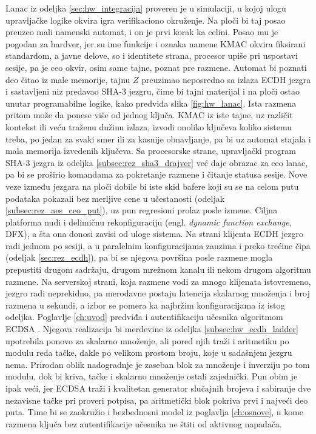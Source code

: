 Lanac iz odeljka \ref{sec:hw_integracija} proveren je u simulaciji, u kojoj ulogu upravljačke logike okvira igra verifikaciono okruženje. Na ploči bi taj posao preuzeo mali namenski automat, i on je prvi korak ka celini. Posao mu je pogodan za hardver, jer su ime funkcije i oznaka namene KMAC okvira fiksirani standardom, a javne delove, so i identitete strana, procesor upiše pri uspostavi sesije, pa je ceo okvir, osim same tajne, poznat pre razmene. Automat bi poznati deo čitao iz male memorije, tajnu $Z$ preuzimao neposredno sa izlaza ECDH jezgra i sastavljeni niz predavao SHA-3 jezgru, čime bi tajni materijal i na ploči ostao unutar programabilne logike, kako predviđa slika \ref{fig:hw_lanac}. Ista razmena pritom može da ponese više od jednog ključa. KMAC iz iste tajne, uz različit kontekst ili veću traženu dužinu izlaza, izvodi onoliko ključeva koliko sistemu treba, po jedan za svaki smer ili za kasnije obnavljanje, pa bi uz automat stajala i mala memorija izvedenih ključeva.
\smallbreak
Sa procesorske strane, upravljački program SHA-3 jezgra iz odeljka \ref{subsec:rez_sha3_drajver} već daje obrazac za ceo lanac, pa bi se proširio komandama za pokretanje razmene i čitanje statusa sesije. Nove veze između jezgara na ploči dobile bi iste skid bafere koji su se na celom putu podataka pokazali bez merljive cene u učestanosti (odeljak \ref{subsec:rez_aes_ceo_put}), uz pun regresioni prolaz posle izmene. Ciljna platforma nudi i delimičnu rekonfiguraciju (engl. \textit{dynamic function exchange}, DFX), a šta ona donosi zavisi od uloge sistema. Na strani klijenta ECDH jezgro radi jednom po sesiji, a u paralelnim konfiguracijama zauzima i preko trećine čipa (odeljak \ref{sec:rez_ecdh}), pa bi se njegova površina posle razmene mogla prepustiti drugom sadržaju, drugom mrežnom kanalu ili nekom drugom algoritmu razmene. Na serverskoj strani, koja razmene vodi za mnogo klijenata istovremeno, jezgro radi neprekidno, pa merodavne postaju latencija skalarnog množenja i broj razmena u sekundi, a izbor se pomera ka najbržim konfiguracijama iz istog odeljka.
\smallbreak
Poglavlje \ref{ch:uvod} predviđa i autentifikaciju učesnika algoritmom ECDSA \cite{fips186}. Njegova realizacija bi merdevine iz odeljka \ref{subsec:hw_ecdh_ladder} upotrebila ponovo za skalarno množenje, ali pored njih traži i aritmetiku po modulu reda tačke, dakle po velikom prostom broju, koje u sadašnjem jezgru nema. Prirodan oblik nadogradnje je zaseban blok za množenje i inverziju po tom modulu, dok bi kriva, tačke i skalarno množenje ostali zajednički. Pun obim je ipak veći, jer ECDSA traži i kvalitetan generator slučajnih brojeva i sabiranje dve nezavisne tačke pri proveri potpisa, pa aritmetički blok pokriva prvi i najveći deo puta. Time bi se zaokružio i bezbednosni model iz poglavlja \ref{ch:osnove}, u kome razmena ključa bez autentifikacije učesnika ne štiti od aktivnog napadača.

